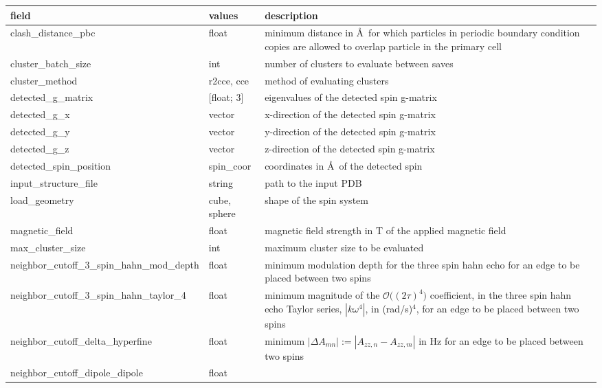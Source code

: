 \documentclass{book}
\begin{document}
\begin{center}
\begin{tabular}{| m{20em} | m{1.5cm}| m{7cm} |}
 \hline 
 \textbf{field} & \textbf{values} & \textbf{description} \\ 
 \hline 
 clash\_distance\_pbc & float & 
 minimum distance in \AA~for which particles in periodic boundary condition 
 copies are allowed to overlap particle in the primary cell\\
 \hline 
 cluster\_batch\_size & int & number of clusters to evaluate between saves \\
 \hline 
 cluster\_method & r2cce, cce & method of evaluating clusters \\
 \hline 
 detected\_g\_matrix & [float; 3] & eigenvalues of the detected spin g-matrix\\
 \hline 
 detected\_g\_x & vector & x-direction of the  detected spin g-matrix\\
 \hline 
 detected\_g\_y & vector & y-direction of the  detected spin g-matrix\\
 \hline 
 detected\_g\_z & vector & z-direction of the  detected spin g-matrix\\
 \hline 
 detected\_spin\_position & spin\_coor 
 & coordinates in \AA~of the detected spin\\
 \hline 
 input\_structure\_file & string & path to the input PDB \\
 \hline 
 load\_geometry & cube, sphere & shape of the spin system \\
 \hline 
 magnetic\_field & float & 
 magnetic field strength in T of the applied magnetic field\\
 \hline 
 max\_cluster\_size & int & maximum cluster size to be evaluated \\
 \hline 
 neighbor\_cutoff\_3\_spin\_hahn\_mod\_depth & float & 
 minimum modulation depth for the three spin hahn echo
 for an edge to be placed between two spins\\
 \hline 
 neighbor\_cutoff\_3\_spin\_hahn\_taylor\_4 & float & 
 minimum magnitude of the $\mathscr{O}\big((2\tau)^4\big)$ coefficient,
 in the three spin hahn echo Taylor series, $|k\omega^4|$,  in (rad/s)$^4$, 
 for an edge to be placed between two spins \\
 \hline 
 neighbor\_cutoff\_delta\_hyperfine & float & 
 minimum $|\Delta A_{mn}| := |A_{zz,n} - A_{zz,m}|$ in Hz 
 for an edge to be placed between two spins\\
 \hline 
 neighbor\_cutoff\_dipole\_dipole & float & 

\end{tabular}
\end{center}
\end{document}
